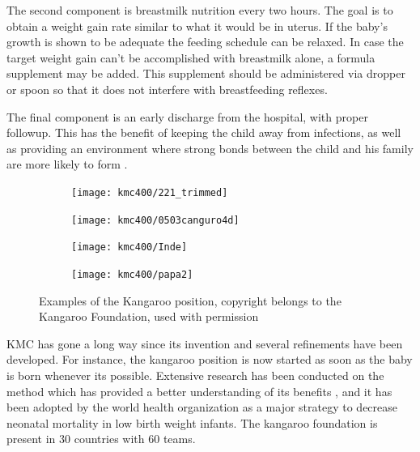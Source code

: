 The second component is breastmilk nutrition every two hours. The goal is to obtain a weight gain rate similar to what it would be in uterus. If the baby's growth is shown to be adequate the feeding schedule can be relaxed. In case the target weight gain can't be accomplished with breastmilk alone, a formula supplement may be added. This supplement should be administered via dropper or spoon so that it does not interfere with breastfeeding reflexes.

The final component is an early discharge from the hospital, with proper followup. This has the benefit of keeping the child away from infections, as well as providing an environment where strong bonds between the child and his family are more likely to form \autocite{charpak_kangaroo_2005}. 

\begin{figure}
    \centering
    \begin{subfigure}{0.45\textwidth}
        \texttt{[image: kmc400/221\_trimmed]}
    \end{subfigure} \hfill
    \begin{subfigure}{0.45\textwidth}
        \texttt{[image: kmc400/0503canguro4d]}
    \end{subfigure}
		\par \bigskip
		\begin{subfigure}{0.45\textwidth}
        \texttt{[image: kmc400/Inde]}
    \end{subfigure} \hfill
		    \begin{subfigure}{0.45\textwidth}
        \texttt{[image: kmc400/papa2]}
    \end{subfigure}
    \caption{Examples of the Kangaroo position, copyright belongs to the Kangaroo Foundation, used with permission}\label{fig_kmc_position}
\end{figure}

KMC has gone a long way since its invention \autocite{charpak_kmc_2011} and several refinements have been developed. For instance, the kangaroo position is now started as soon as the baby is born whenever its possible. Extensive research has been conducted on the method which has provided a better understanding of its benefits \autocite{the_cochrane_collaboration_kangaroo_2014}, and it  has been adopted by the world health organization as a major strategy to decrease neonatal mortality in low birth weight infants. The kangaroo foundation is present in 30 countries with 60 teams. 


